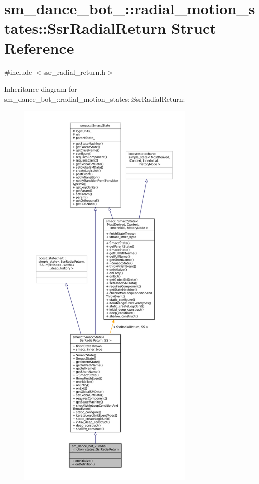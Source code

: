 \hypertarget{structsm__dance__bot__2_1_1radial__motion__states_1_1SsrRadialReturn}{}\section{sm\+\_\+dance\+\_\+bot\+\_\+:\+:radial\+\_\+motion\+\_\+states\+:\+:Ssr\+Radial\+Return Struct Reference}
\label{structsm__dance__bot__2_1_1radial__motion__states_1_1SsrRadialReturn}


{\ttfamily \#include $<$ssr\+\_\+radial\+\_\+return.\+h$>$}



Inheritance diagram for sm\+\_\+dance\+\_\+bot\+\_\+:\+:radial\+\_\+motion\+\_\+states\+:\+:Ssr\+Radial\+Return\+:
\nopagebreak
\begin{figure}[H]
\begin{center}
\leavevmode
\includegraphics[height=550pt]{structsm__dance__bot__2_1_1radial__motion__states_1_1SsrRadialReturn__inherit__graph}
\end{center}
\end{figure}


